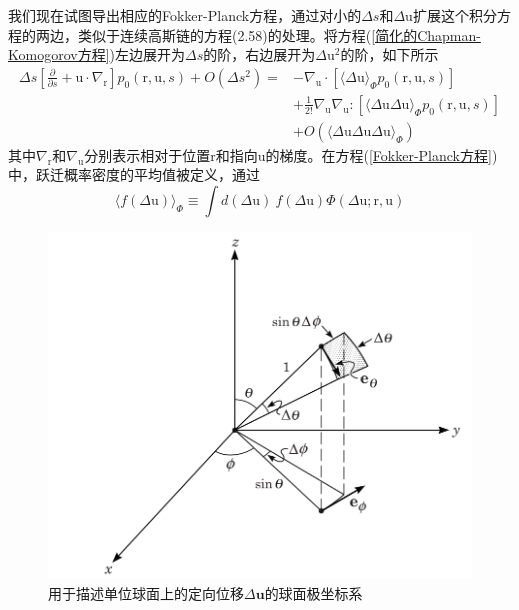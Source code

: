 我们现在试图导出相应的Fokker-Planck方程，通过对小的$\Delta s$和$\Delta \mathrm{u}$扩展这个积分方程的两边，类似于连续高斯链的方程(2.58)的处理。将方程(\ref{简化的Chapman-Komogorov方程})左边展开为$\Delta s$的阶，右边展开为$\Delta \mathrm{u}^2$的阶，如下所示\\
\begin{equation}
\begin{aligned}
	\Delta s \left[\frac{\partial}{\partial s}+\mathrm{u}\cdot\nabla_\mathrm{r}\right]p_0(\mathrm{r},\mathrm{u},s)+O(\Delta s^2)=&-\nabla_\mathrm{u} \cdot [\langle \Delta \mathrm{u}\rangle_\Phi p_0(\mathrm{r},\mathrm{u},s)]\\&+\frac{1}{2!}\nabla_\mathrm{u} \nabla_\mathrm{u} :[\langle\Delta \mathrm{u}\Delta \mathrm{u} \rangle_\Phi p_0(\mathrm{r},\mathrm{u},s)]\\&+O(\langle \Delta \mathrm{u} \Delta \mathrm{u}\Delta \mathrm{u}\rangle_\Phi)\label{Fokker-Planck方程}
\end{aligned}
\end{equation}
其中$\nabla_\mathrm{r}$和$\nabla_\mathrm{u}$分别表示相对于位置$\mathrm{r}$和指向$\mathrm{u}$的梯度。在方程(\ref{Fokker-Planck方程})中，跃迁概率密度的平均值被定义，通过
\begin{equation}
\langle f(\Delta \mathrm{u})\rangle _\Phi\equiv\int d(\Delta \mathrm{u})\ f(\Delta \mathrm{u} )\Phi(\Delta \mathrm{u};\mathrm{r},\mathrm{u})
\end{equation}
\begin{figure}[H]
	\centering   
	\includegraphics[width=12cm]{./figures/7.png}
	\caption{用于描述单位球面上的定向位移$\Delta \mathbf{u}$的球面极坐标系}
	\label{用于描述单位球面上的定向位移的球面极坐标系}
\end{figure}

